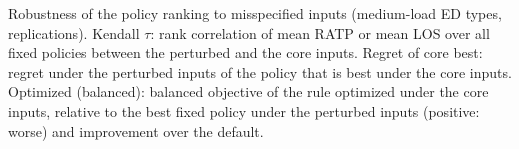 \begin{table}[!t]
\centering
\caption{Robustness of the policy ranking to misspecified inputs (medium-load ED types, \NRobReps{} replications). Kendall $\tau$: rank correlation of mean RATP or mean LOS over all fixed policies between the perturbed and the core inputs. Regret of core best: regret under the perturbed inputs of the policy that is best under the core inputs. Optimized (balanced): balanced objective of the rule optimized under the core inputs, relative to the best fixed policy under the perturbed inputs (positive: worse) and improvement over the default.}
\label{tab:rob}
\footnotesize
\begin{adjustbox}{max width=\linewidth}\end{adjustbox}
\end{table}
